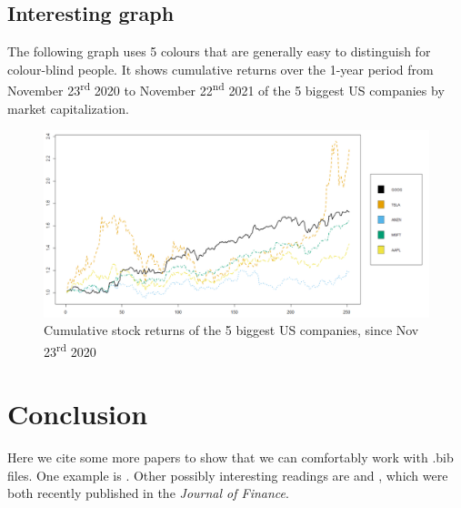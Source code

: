 \documentclass[titlepage]{article}
\begin{document}
\subsection{Interesting graph}
The following graph uses 5 colours that are generally easy to distinguish for colour-blind people. It shows cumulative returns over the 1-year period from November 23\textsuperscript{rd} 2020 to November 22\textsuperscript{nd} 2021 of the 5 biggest US companies by market capitalization.
 \begin{figure}[H]
   \includegraphics[scale=0.25]{cumreturns.png}
    \caption{Cumulative stock returns of the 5 biggest US companies, since Nov 23\textsuperscript{rd} 2020}
\end{figure}

\section{Conclusion}
Here we cite some more papers to show that we can comfortably work with .bib files. One example is \cite{Black1973}. Other possibly interesting readings are \cite{pursiainen2020cultural} and \cite{barras2020skill}, which were both recently published in the \textit{Journal of Finance}.

\newpage

\printbibliography
\end{document}
